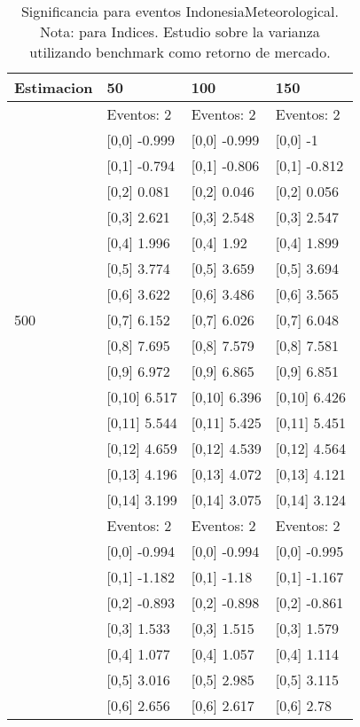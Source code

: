 \begin{table}

\caption{Significancia para eventos IndonesiaMeteorological. Nota: para Indices. Estudio sobre la varianza utilizando benchmark como retorno de mercado.}
\centering
\begin{tabular}[t]{llll}
\toprule
Estimacion & 50 & 100 & 150\\
\midrule
 & Eventos:  2 & Eventos:  2 & Eventos:  2\\
 & {}[0,0] -0.999 & {}[0,0] -0.999 & {}[0,0] -1\\
 & {}[0,1] -0.794 & {}[0,1] -0.806 & {}[0,1] -0.812\\
 & {}[0,2] 0.081 & {}[0,2] 0.046 & {}[0,2] 0.056\\
 & {}[0,3] 2.621 & {}[0,3] 2.548 & {}[0,3] 2.547\\
\addlinespace
 & {}[0,4] 1.996 & {}[0,4] 1.92 & {}[0,4] 1.899\\
 & {}[0,5] 3.774 & {}[0,5] 3.659 & {}[0,5] 3.694\\
 & {}[0,6] 3.622 & {}[0,6] 3.486 & {}[0,6] 3.565\\
500 & {}[0,7] 6.152 & {}[0,7] 6.026 & {}[0,7] 6.048\\
 & {}[0,8] 7.695 & {}[0,8] 7.579 & {}[0,8] 7.581\\
\addlinespace
 & {}[0,9] 6.972 & {}[0,9] 6.865 & {}[0,9] 6.851\\
 & {}[0,10] 6.517 & {}[0,10] 6.396 & {}[0,10] 6.426\\
 & {}[0,11] 5.544 & {}[0,11] 5.425 & {}[0,11] 5.451\\
 & {}[0,12] 4.659 & {}[0,12] 4.539 & {}[0,12] 4.564\\
 & {}[0,13] 4.196 & {}[0,13] 4.072 & {}[0,13] 4.121\\
\addlinespace
 & {}[0,14] 3.199 & {}[0,14] 3.075 & {}[0,14] 3.124\\
 & Eventos:  2 & Eventos:  2 & Eventos:  2\\
 & {}[0,0] -0.994 & {}[0,0] -0.994 & {}[0,0] -0.995\\
 & {}[0,1] -1.182 & {}[0,1] -1.18 & {}[0,1] -1.167\\
 & {}[0,2] -0.893 & {}[0,2] -0.898 & {}[0,2] -0.861\\
\addlinespace
 & {}[0,3] 1.533 & {}[0,3] 1.515 & {}[0,3] 1.579\\
 & {}[0,4] 1.077 & {}[0,4] 1.057 & {}[0,4] 1.114\\
 & {}[0,5] 3.016 & {}[0,5] 2.985 & {}[0,5] 3.115\\
 & {}[0,6] 2.656 & {}[0,6] 2.617 & {}[0,6] 2.78\\

\end{tabular}
\end{table}
